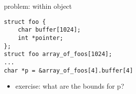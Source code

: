 \begin{frame}[fragile,label=withinObj]{problem: within object}
\begin{lstlisting}
struct foo {
    char buffer[1024];
    int *pointer;
};
struct foo array_of_foos[1024];
...
char *p = &array_of_foos[4].buffer[4]
\end{lstlisting}
\begin{itemize}
\item exercise: what are the bounds for p?
\end{itemize}
\end{frame}
